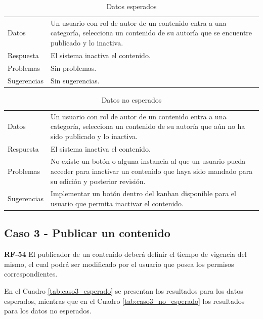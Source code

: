 \documentclass[10pt,times,twocolumn]{article}
\begin{document}
\begin{table}[H]
    \centering
    \begin{tabular}{p{3cm}p{4cm}}
        \rowcolor{gray!15}
        Datos & Un usuario con rol de autor de un contenido entra a una categoría, selecciona un contenido de su autoría que se encuentre publicado y lo inactiva.\\
       	Respuesta & El sistema inactiva el contenido.\\
       	Problemas & Sin problemas.\\
       	Sugerencias & Sin sugerencias.\\
    \end{tabular}
    \caption{Datos esperados}
    \label{tab:caso2_esperado}
\end{table}

\begin{table}[H]
    \centering
    \begin{tabular}{p{3cm}p{4cm}}
        \rowcolor{gray!15}
        Datos & Un usuario con rol de autor de un contenido entra a una categoría, selecciona un contenido de su autoría que aún no ha sido publicado y lo inactiva.\\
        Respuesta & El sistema inactiva el contenido.\\
       	Problemas & No existe un botón o alguna instancia al que un usuario pueda acceder para inactivar un contenido que haya sido mandado para su edición y posterior revisión.\\
       	Sugerencias & Implementar un botón dentro del kanban disponible para el usuario que permita inactivar el contenido.\\
    \end{tabular}
    \caption{Datos no esperados}
    \label{tab:caso2_no_esperado}
\end{table}

\subsection{Caso 3 - Publicar un contenido}

\textbf{RF-54} El publicador de un contenido deberá definir el tiempo de vigencia del mismo, el  cual podrá ser modificado por el usuario que posea los permisos correspondientes.

En el Cuadro \ref{tab:caso3_esperado} se presentan los resultados para los datos esperados, mientras que en el Cuadro \ref{tab:caso3_no_esperado} los resultados para los datos no esperados.
\end{document}
